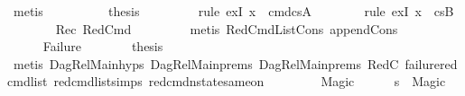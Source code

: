 \begin{isabellebody}
\ metis\ \ \ \ \isanewline
\ \ \ \ \isamarkupfalse%
\ {\isacharquery}{\kern0pt}thesis\ \isanewline
\ \ \ \ \ \ \isamarkupfalse%
\ {\isacharparenleft}{\kern0pt}rule\ exI{\isacharbrackleft}{\kern0pt}\ {\isacharquery}{\kern0pt}x\ {\isacharequal}{\kern0pt}\ {\isachardoublequoteopen}{\isacharparenleft}{\kern0pt}cmd{\isacharparenright}{\kern0pt}{\isacharhash}{\kern0pt}cs{}A{\isachardoublequoteclose}{\isacharbrackright}{\kern0pt}{\isacharparenright}{\kern0pt}\isanewline
\ \ \ \ \ \ \isamarkupfalse%
\ {\isacharparenleft}{\kern0pt}rule\ exI{\isacharbrackleft}{\kern0pt}\ {\isacharquery}{\kern0pt}x\ {\isacharequal}{\kern0pt}\ {\isachardoublequoteopen}cs{}B{\isachardoublequoteclose}{\isacharbrackright}{\kern0pt}{\isacharparenright}{\kern0pt}\isanewline
\ \ \ \ \ \ \isamarkupfalse%
\ Rec\ RedCmd{}\ \isanewline
\ \ \ \ \ \ \isamarkupfalse%
\ {\isacharparenleft}{\kern0pt}metis\ RedCmdListCons\ append{\isacharunderscore}{\kern0pt}Cons{\isacharparenright}{\kern0pt}\ \ \ \ \ \ \isanewline
\ \ \isamarkupfalse%
\isanewline
\ \ \ \ \isamarkupfalse%
\ Failure\isanewline
\ \ \ \ \isamarkupfalse%
\ \isamarkupfalse%
\ {\isacharquery}{\kern0pt}thesis\ \isanewline
\ \ \ \ \ \ \isamarkupfalse%
\ {\isacharparenleft}{\kern0pt}metis\ DagRel{\isacharunderscore}{\kern0pt}Main{\isachardot}{\kern0pt}hyps{\isacharparenleft}{\kern0pt}{}{\isacharparenright}{\kern0pt}\ DagRel{\isacharunderscore}{\kern0pt}Main{\isachardot}{\kern0pt}prems{\isacharparenleft}{\kern0pt}{}{\isacharparenright}{\kern0pt}\ DagRel{\isacharunderscore}{\kern0pt}Main{\isachardot}{\kern0pt}prems{\isacharparenleft}{\kern0pt}{}{\isacharparenright}{\kern0pt}\ RedC{}\ failure{\isacharunderscore}{\kern0pt}red{\isacharunderscore}{\kern0pt}cmd{\isacharunderscore}{\kern0pt}list\ red{\isacharunderscore}{\kern0pt}cmd{\isacharunderscore}{\kern0pt}list{\isachardot}{\kern0pt}simps\ red{\isacharunderscore}{\kern0pt}cmd{\isacharunderscore}{\kern0pt}nstate{\isacharunderscore}{\kern0pt}same{\isacharunderscore}{\kern0pt}on{\isacharparenright}{\kern0pt}\isanewline
\ \ \isamarkupfalse%
\isanewline
\ \ \ \ \isamarkupfalse%
\ Magic\isanewline
\ \ \ \ \isamarkupfalse%
\ {\isachardoublequoteopen}s{\isacharprime}{\kern0pt}\ {\isacharequal}{\kern0pt}\ Magic{\isachardoublequoteclose}\ \isamarkupfalse%

\end{isabellebody}
